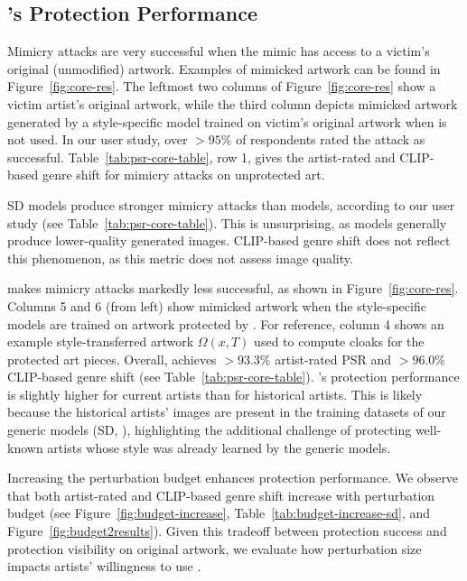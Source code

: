 \secspace
\subsection{\system{}'s Protection Performance}
\label{sec:cloaking-results}

 Mimicry attacks are
very successful when the mimic has access to a victim's original (unmodified)
artwork. Examples of mimicked artwork can be found in
Figure~\ref{fig:core-res}. The leftmost two columns of Figure~\ref{fig:core-res} show a
victim artist's original artwork, while the third column depicts mimicked
artwork generated by a style-specific model trained on victim's original
artwork when \system{} is not used. In our user study, over $>95\%$ of
respondents rated the attack as successful. Table~\ref{tab:psr-core-table},
row 1, gives the artist-rated and CLIP-based genre shift for mimicry attacks on
unprotected art. 

SD models produce stronger mimicry attacks than \dalleM{} models, according
to our user study (see Table~\ref{tab:psr-core-table}). This is unsurprising,
as \dalleM{} models generally produce lower-quality generated
images. CLIP-based genre shift does not reflect this phenomenon, as this metric does
not assess image quality.  

 \system{} makes
mimicry attacks markedly less successful, as shown in
Figure~\ref{fig:core-res}. Columns 5 and 6 (from left) show mimicked artwork
when the style-specific models are trained on artwork protected by
\system{}. For reference, column 4 shows an example style-transferred artwork
$\Omega(x, T)$ used to compute \system{} cloaks for the protected art
pieces. Overall, \system{} achieves $> 93.3\%$ artist-rated PSR and
$> 96.0\%$ CLIP-based genre shift (see Table~\ref{tab:psr-core-table}). \system{}'s
protection performance is slightly higher for current artists than for
historical artists. This is likely because the historical artists' images are
present in the training datasets of our generic models (SD, \dalleM),
highlighting the additional challenge of protecting well-known artists whose
style was already learned by the generic models.

 Increasing the
\system{} perturbation budget enhances protection performance. We observe
that both artist-rated and CLIP-based genre shift increase with perturbation budget
(see Figure~\ref{fig:budget-increase}, Table~\ref{tab:budget-increase-sd},
and Figure~\ref{fig:budget2results}). Given this tradeoff between protection
success and \system{} protection visibility on original artwork, we evaluate
how perturbation size impacts artists' willingness to use \system{}. 

